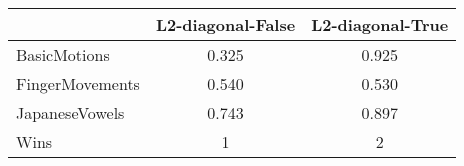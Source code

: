 \begin{tabular}{lcc}
\toprule
{} &  L2-diagonal-False &  L2-diagonal-True \\
\midrule
BasicMotions    &              0.325 &             0.925 \\
FingerMovements &              0.540 &             0.530 \\
JapaneseVowels  &              0.743 &             0.897 \\ 
\midrule
Wins &                  1 &                 2 \\
\bottomrule
\end{tabular}
